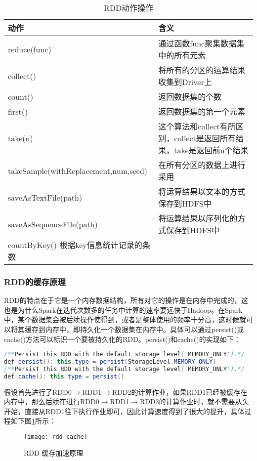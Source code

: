\begin{table}[h] %
\caption{RDD动作操作} %
\centering
\label{tab:action}
\begin{tabular}{p{6cm}|p{8cm}} %
\hline
\hline
动作  & 含义 \\ %
\hline %
reduce(func)  & 通过函数func聚集数据集中的所有元素\\
\hline
collect()  & 将所有的分区的运算结果收集到Driver上\\
\hline
count()  & 返回数据集的个数\\
\hline
first() & 返回数据集的第一个元素\\
\hline
take(n) & 这个算法和collect有所区别，collect是返回所有结果，take是返回前n个结果\\
\hline
takeSample(withReplacement,num,seed) & 在所有分区的数据上进行采用\\
\hline
saveAsTextFile(path) & 将运算结果以文本的方式保存到HDFS中\\
\hline
saveAsSequenceFile(path) & 将运算结果以序列化的方式保存到HDFS中\\
\hline
countByKey() 根据key信息统计记录的条数\\
\hline
\hline
\end{tabular}
\end{table}

\subsubsection{RDD的缓存原理}
RDD的特点在于它是一个内存数据结构，所有对它的操作是在内存中完成的，这也是为什么Spark在迭代次数多的任务中计算的速率要远快于Hadoop。在Spark中，某个数据集会被后续操作使得到，或者是整体使用的频率十分高，这时候就可以将其缓存到内存中，即持久化一个数据集在内存中。具体可以通过persist()或cache()方法可以标识一个要被持久化的RDD。persist()和cache()的实现如下：
\begin{lstlisting}[language=Java,numbers=none,frame=none]
/**Persist this RDD with the default storage level('MEMORY_ONLY').*/
def persist(): this.type = persist(StorageLevel.MEMORY_ONLY)
/**Persist this RDD with the default storage level('MEMORY_ONLY').*/
def cache(): this.type = persist()
\end{lstlisting}

假设首先进行了RDD0$\rightarrow$RDD1$\rightarrow$RDD2的计算作业，如果RDD1已经被缓存在内存中，那么后续在进行RDD0$\rightarrow$RDD1$\rightarrow$RDD3的计算作业时，就不需要从头开始，直接从RDD1往下执行作业即可，因此计算速度得到了很大的提升，具体过程如下图\ref{fig:rdd_cache}所示：
\begin{figure}[htp]
\centering
\texttt{[image: rdd\_cache]}
\caption{RDD 缓存加速原理}
\label{fig:rdd_cache}
\end{figure}

